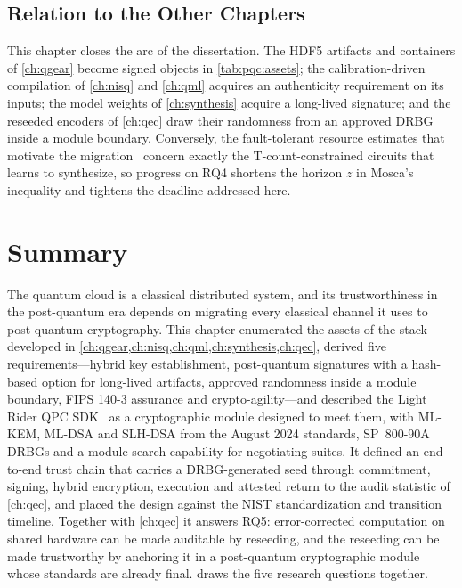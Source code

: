 \subsection{Relation to the Other Chapters}\label{sec:pqc:relation}

This chapter closes the arc of the dissertation. The HDF5 artifacts and containers of \cref{ch:qgear} become signed objects in \cref{tab:pqc:assets}; the calibration-driven compilation of \cref{ch:nisq} and \cref{ch:qml} acquires an authenticity requirement on its inputs; the model weights of \cref{ch:synthesis} acquire a long-lived signature; and the reseeded encoders of \cref{ch:qec} draw their randomness from an approved DRBG inside a module boundary. Conversely, the fault-tolerant resource estimates that motivate the migration~\cite{gidney2021rsa,gidney2025million} concern exactly the T-count-constrained circuits that \rubriq{} learns to synthesize, so progress on RQ4 shortens the horizon $z$ in Mosca's inequality and tightens the deadline addressed here.

\section{Summary}\label{sec:pqc:summary}

The quantum cloud is a classical distributed system, and its trustworthiness in the post-quantum era depends on migrating every classical channel it uses to post-quantum cryptography. This chapter enumerated the assets of the stack developed in \cref{ch:qgear,ch:nisq,ch:qml,ch:synthesis,ch:qec}, derived five requirements---hybrid key establishment, post-quantum signatures with a hash-based option for long-lived artifacts, approved randomness inside a module boundary, FIPS 140-3 assurance and crypto-agility---and described the Light Rider QPC SDK~\cite{guo2026lightriderqpc} as a cryptographic module designed to meet them, with ML-KEM, ML-DSA and SLH-DSA from the August 2024 standards, SP~800-90A DRBGs and a module search capability for negotiating suites. It defined an end-to-end trust chain that carries a DRBG-generated seed through commitment, signing, hybrid encryption, execution and attested return to the audit statistic of \cref{ch:qec}, and placed the design against the NIST standardization and transition timeline. Together with \cref{ch:qec} it answers RQ5: error-corrected computation on shared hardware can be made auditable by reseeding, and the reseeding can be made trustworthy by anchoring it in a post-quantum cryptographic module whose standards are already final.  draws the five research questions together.
